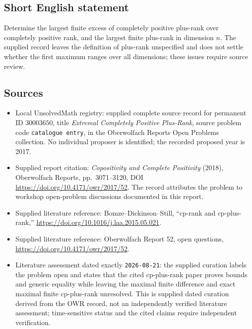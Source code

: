 \documentclass[11pt]{article}
\begin{document}
\subsection{Short English statement}
Determine the largest finite excess of completely positive plus-rank over completely positive rank, and the largest finite plus-rank in dimension $n$. The supplied record leaves the definition of plus-rank unspecified and does not settle whether the first maximum ranges over all dimensions; these issues require source review.
\subsection{Sources}
\begin{itemize}
\item Local UnsolvedMath registry: supplied complete source record for permanent ID $30003650$, title \emph{Extremal Completely Positive Plus-Rank}, source problem code \texttt{catalogue entry}, in the Oberwolfach Reports Open Problems collection. No individual proposer is identified; the recorded proposed year is 2017.
\item Supplied report citation: \emph{Copositivity and Complete Positivity} (2018), Oberwolfach Reports, pp.~3071--3120, DOI \url{https://doi.org/10.4171/owr/2017/52}. The record attributes the problem to workshop open-problem discussions documented in this report.
\item Supplied literature reference: Bomze--Dickinson--Still, ``cp-rank and cp-plus-rank,'' \url{https://doi.org/10.1016/j.laa.2015.05.021}.
\item Supplied literature reference: Oberwolfach Report 52, open questions, \url{https://doi.org/10.4171/owr/2017/52}.
\item Literature assessment dated exactly \texttt{2026-08-21}: the supplied curation labels the problem open and states that the cited cp-plus-rank paper proves bounds and generic equality while leaving the maximal finite difference and exact maximal finite cp-plus-rank unresolved. This is supplied dated curation derived from the OWR record, not an independently verified literature assessment; time-sensitive status and the cited claims require independent verification.
\end{itemize}
\end{document}
